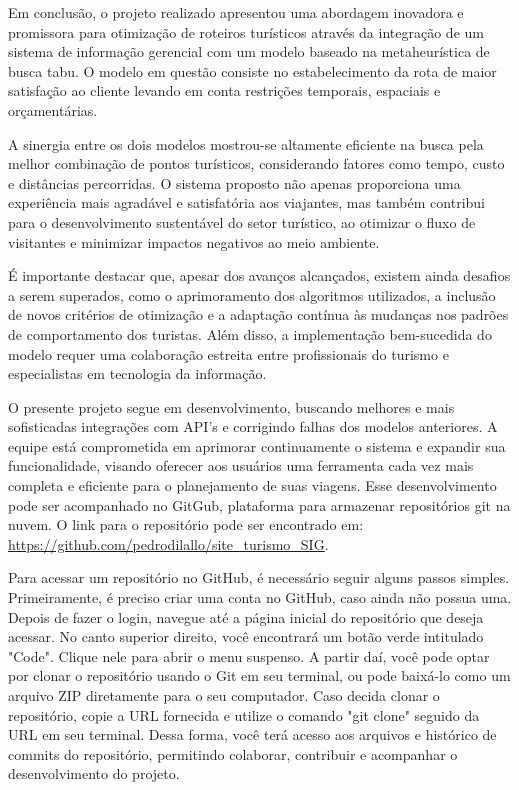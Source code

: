 Em conclusão, o projeto realizado apresentou uma abordagem inovadora e promissora para otimização de roteiros turísticos através da integração de um sistema de informação gerencial com um modelo baseado na metaheurística de busca tabu. O modelo em questão consiste no estabelecimento da rota de maior satisfação ao cliente levando em conta restrições temporais, espaciais e orçamentárias.

A sinergia entre os dois modelos mostrou-se altamente eficiente na busca pela melhor combinação de pontos turísticos, considerando fatores como tempo, custo e distâncias percorridas. O sistema proposto não apenas proporciona uma experiência mais agradável e satisfatória aos viajantes, mas também contribui para o desenvolvimento sustentável do setor turístico, ao otimizar o fluxo de visitantes e minimizar impactos negativos ao meio ambiente.

É importante destacar que, apesar dos avanços alcançados, existem ainda desafios a serem superados, como o aprimoramento dos algoritmos utilizados, a inclusão de novos critérios de otimização e a adaptação contínua às mudanças nos padrões de comportamento dos turistas. Além disso, a implementação bem-sucedida do modelo requer uma colaboração estreita entre profissionais do turismo e especialistas em tecnologia da informação.

O presente projeto segue em desenvolvimento, buscando melhores e mais sofisticadas integrações com API's e corrigindo falhas dos modelos anteriores. A equipe está comprometida em aprimorar continuamente o sistema e expandir sua funcionalidade, visando oferecer aos usuários uma ferramenta cada vez mais completa e eficiente para o planejamento de suas viagens. Esse desenvolvimento pode ser acompanhado no GitGub, plataforma para armazenar repositórios git na nuvem. O link para o repositório pode ser encontrado em: \url{https://github.com/pedrodilallo/site_turismo_SIG}.

Para acessar um repositório no GitHub, é necessário seguir alguns passos simples. Primeiramente, é preciso criar uma conta no GitHub, caso ainda não possua uma. Depois de fazer o login, navegue até a página inicial do repositório que deseja acessar. No canto superior direito, você encontrará um botão verde intitulado "Code". Clique nele para abrir o menu suspenso. A partir daí, você pode optar por clonar o repositório usando o Git em seu terminal, ou pode baixá-lo como um arquivo ZIP diretamente para o seu computador. Caso decida clonar o repositório, copie a URL fornecida e utilize o comando "git clone" seguido da URL em seu terminal. Dessa forma, você terá acesso aos arquivos e histórico de commits do repositório, permitindo colaborar, contribuir e acompanhar o desenvolvimento do projeto.